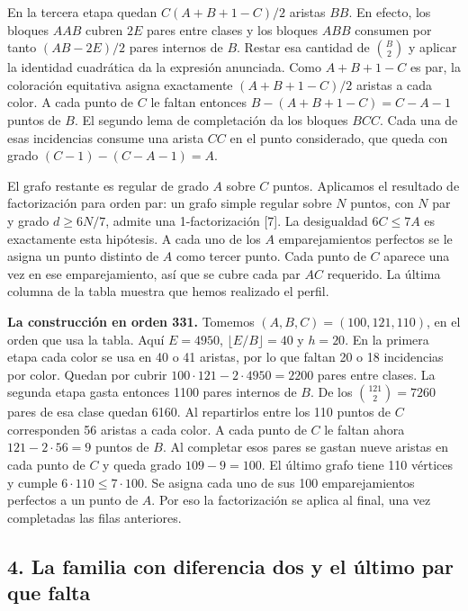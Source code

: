 \documentclass[spanish,11pt,a4paper]{article}
\begin{document}
En la tercera etapa quedan \(C(A+B+1-C)/2\) aristas \(BB\). En efecto, los bloques \(AAB\) cubren \(2E\) pares entre clases y los bloques \(ABB\) consumen por tanto \((AB-2E)/2\) pares internos de \(B\). Restar esa cantidad de \(\binom B2\) y aplicar la identidad cuadrática da la expresión anunciada. Como \(A+B+1-C\) es par, la coloración equitativa asigna exactamente \((A+B+1-C)/2\) aristas a cada color. A cada punto de \(C\) le faltan entonces \(B-(A+B+1-C)=C-A-1\) puntos de \(B\). El segundo lema de completación da los bloques \(BCC\). Cada una de esas incidencias consume una arista \(CC\) en el punto considerado, que queda con grado \((C-1)-(C-A-1)=A\).

El grafo restante es regular de grado \(A\) sobre \(C\) puntos. Aplicamos el resultado de factorización para orden par: un grafo simple regular sobre \(N\) puntos, con \(N\) par y grado \(d\ge6N/7\), admite una 1-factorización {[}7{]}. La desigualdad \(6C\le7A\) es exactamente esta hipótesis. A cada uno de los \(A\) emparejamientos perfectos se le asigna un punto distinto de \(A\) como tercer punto. Cada punto de \(C\) aparece una vez en ese emparejamiento, así que se cubre cada par \(AC\) requerido. La última columna de la tabla muestra que hemos realizado el perfil.

\textbf{La construcción en orden 331.} Tomemos \((A,B,C)=(100,121,110)\), en el orden que usa la tabla. Aquí \(E=4950\), \(\lfloor E/B\rfloor=40\) y \(h=20\). En la primera etapa cada color se usa en 40 o 41 aristas, por lo que faltan 20 o 18 incidencias por color. Quedan por cubrir \(100\cdot121-2\cdot4950=2200\) pares entre clases. La segunda etapa gasta entonces 1100 pares internos de \(B\). De los \(\binom{121}{2}=7260\) pares de esa clase quedan 6160. Al repartirlos entre los 110 puntos de \(C\) corresponden 56 aristas a cada color. A cada punto de \(C\) le faltan ahora \(121-2\cdot56=9\) puntos de \(B\). Al completar esos pares se gastan nueve aristas en cada punto de \(C\) y queda grado \(109-9=100\). El último grafo tiene 110 vértices y cumple \(6\cdot110\le7\cdot100\). Se asigna cada uno de sus 100 emparejamientos perfectos a un punto de \(A\). Por eso la factorización se aplica al final, una vez completadas las filas anteriores.

\subsection{4. La familia con diferencia dos y el último par que falta}\label{la-familia-con-diferencia-dos-y-el-uxfaltimo-par-que-falta}
\end{document}
